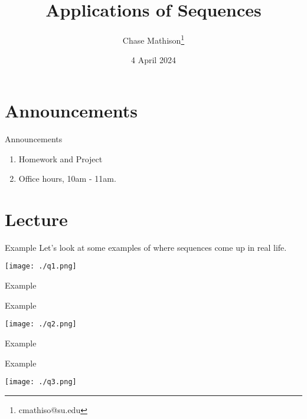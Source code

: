 \documentclass[presentation]{beamer}
\institute[SU]{Shenandoah University}
\author{Chase Mathison\thanks{cmathiso@su.edu}}
\date{4 April 2024}
\title{Applications of Sequences}
\begin{document}
\maketitle

\section{Announcements}
\label{sec:orged4d64f}
\begin{frame}[label={sec:orgfb96eae}]{Announcements}
\begin{enumerate}
\item Homework and Project
\item Office hours, 10am - 11am.
\end{enumerate}
\end{frame}

\section{Lecture}
\label{sec:orga0fc616}
\begin{frame}[label={sec:orgb700b43}]{Example}
Let's look at some examples of where sequences come up in real life.

\begin{center}
\texttt{[image: ./q1.png]}
\end{center}

\vspace{10in}
\end{frame}

\begin{frame}[label={sec:orgc15c121}]{Example}
\end{frame}

\begin{frame}[label={sec:org0624727}]{Example}
\begin{center}
\texttt{[image: ./q2.png]}
\end{center}

\vspace{10in}
\end{frame}

\begin{frame}[label={sec:org4bc8059}]{Example}
\end{frame}

\begin{frame}[label={sec:org7384b0a}]{Example}
\begin{center}
\texttt{[image: ./q3.png]}
\end{center}

\vspace{10in}
\end{frame}
\end{document}
